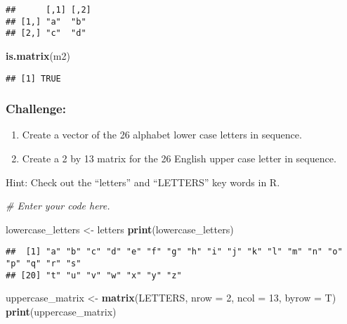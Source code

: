 \documentclass[
]{article}
\newenvironment{Shaded}{\begin{snugshade}}{\end{snugshade}}
\newcommand{\AttributeTok}[1]{\textcolor[rgb]{0.13,0.29,0.53}{#1}}
\newcommand{\CommentTok}[1]{\textcolor[rgb]{0.56,0.35,0.01}{\textit{#1}}}
\newcommand{\DecValTok}[1]{\textcolor[rgb]{0.00,0.00,0.81}{#1}}
\newcommand{\FunctionTok}[1]{\textcolor[rgb]{0.13,0.29,0.53}{\textbf{#1}}}
\newcommand{\NormalTok}[1]{#1}
\newcommand{\OtherTok}[1]{\textcolor[rgb]{0.56,0.35,0.01}{#1}}
\providecommand{\tightlist}{%
  \setlength{\itemsep}{0pt}\setlength{\parskip}{0pt}}
\begin{document}
\begin{verbatim}
##      [,1] [,2]
## [1,] "a"  "b" 
## [2,] "c"  "d"
\end{verbatim}

\begin{Shaded}
\begin{Highlighting}[]
\FunctionTok{is.matrix}\NormalTok{(m2)}
\end{Highlighting}
\end{Shaded}

\begin{verbatim}
## [1] TRUE
\end{verbatim}

\subsubsection{Challenge:}\label{challenge-1}

\begin{enumerate}
\def\labelenumi{\arabic{enumi}.}
\tightlist
\item
  Create a vector of the 26 alphabet lower case letters in sequence.
\item
  Create a 2 by 13 matrix for the 26 English upper case letter in
  sequence.
\end{enumerate}

Hint: Check out the ``letters'' and ``LETTERS'' key words in R.

\begin{Shaded}
\begin{Highlighting}[]
\CommentTok{\# Enter your code here.}

\NormalTok{lowercase\_letters }\OtherTok{\textless{}{-}}\NormalTok{ letters}
\FunctionTok{print}\NormalTok{(lowercase\_letters)}
\end{Highlighting}
\end{Shaded}

\begin{verbatim}
##  [1] "a" "b" "c" "d" "e" "f" "g" "h" "i" "j" "k" "l" "m" "n" "o" "p" "q" "r" "s"
## [20] "t" "u" "v" "w" "x" "y" "z"
\end{verbatim}

\begin{Shaded}
\begin{Highlighting}[]
\NormalTok{uppercase\_matrix }\OtherTok{\textless{}{-}} \FunctionTok{matrix}\NormalTok{(LETTERS,}
                           \AttributeTok{nrow =} \DecValTok{2}\NormalTok{,}
                           \AttributeTok{ncol =} \DecValTok{13}\NormalTok{,}
                           \AttributeTok{byrow =}\NormalTok{ T)}
\FunctionTok{print}\NormalTok{(uppercase\_matrix)}
\end{Highlighting}
\end{Shaded}
\end{document}

